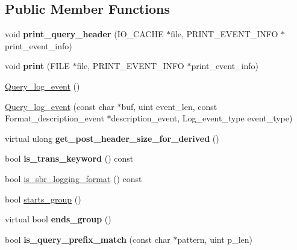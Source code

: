 \subsection*{Public Member Functions}
\begin{DoxyCompactItemize}
\item 
\mbox{\label{classQuery__log__event_ace9dae10ee6c2c11ef34d678baa594d5}} 
void {\bfseries print\+\_\+query\+\_\+header} (I\+O\+\_\+\+C\+A\+C\+HE $\ast$file, P\+R\+I\+N\+T\+\_\+\+E\+V\+E\+N\+T\+\_\+\+I\+N\+FO $\ast$print\+\_\+event\+\_\+info)
\item 
\mbox{\label{classQuery__log__event_a151ce375bee8d6ec0058c7bd31712a15}} 
void {\bfseries print} (F\+I\+LE $\ast$file, P\+R\+I\+N\+T\+\_\+\+E\+V\+E\+N\+T\+\_\+\+I\+N\+FO $\ast$print\+\_\+event\+\_\+info)
\item 
\mbox{\hyperlink{classQuery__log__event_a3420653875185a8dff0c28831ef7bd2a}{Query\+\_\+log\+\_\+event}} ()
\item 
\mbox{\hyperlink{classQuery__log__event_a13b9cc67eca9afb925b298ab2e02a03d}{Query\+\_\+log\+\_\+event}} (const char $\ast$buf, uint event\+\_\+len, const Format\+\_\+description\+\_\+event $\ast$description\+\_\+event, Log\+\_\+event\+\_\+type event\+\_\+type)
\item 
\mbox{\label{classQuery__log__event_a443215abfdd80c4621298306bb404369}} 
virtual ulong {\bfseries get\+\_\+post\+\_\+header\+\_\+size\+\_\+for\+\_\+derived} ()
\item 
\mbox{\label{classQuery__log__event_a298d688fcc930e47087634b31aeee824}} 
bool {\bfseries is\+\_\+trans\+\_\+keyword} () const
\item 
bool \mbox{\hyperlink{classQuery__log__event_a2a3e67710fa962765847ed1df1552864}{is\+\_\+sbr\+\_\+logging\+\_\+format}} () const
\item 
bool \mbox{\hyperlink{classQuery__log__event_a694cad8964206f7838bae799319fc707}{starts\+\_\+group}} ()
\item 
\mbox{\label{classQuery__log__event_af5065b48c330a7b077229c428b404bdb}} 
virtual bool {\bfseries ends\+\_\+group} ()
\item 
\mbox{\label{classQuery__log__event_aaf5b47e15475d02ed443a7722f434074}} 
bool {\bfseries is\+\_\+query\+\_\+prefix\+\_\+match} (const char $\ast$pattern, uint p\+\_\+len)
\end{DoxyCompactItemize}
